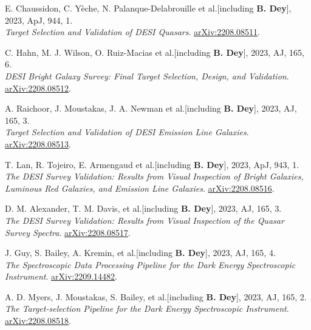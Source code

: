 \begin{etaremune}[leftmargin=40pt,labelsep=10pt]
 \item E. Chaussidon, C. Y\`eche, N. Palanque-Delabrouille et al.[including \textbf{B. Dey}], 2023, ApJ, 944, 1. \\ \textrm{\textit{Target Selection and Validation of DESI Quasars}}. \href{https://arxiv.org/abs/2208.08511}{arXiv:2208.08511}.
 
 \item C. Hahn, M. J. Wilson, O. Ruiz-Macias et al.[including \textbf{B. Dey}], 2023, AJ, 165, 6. \\ \textrm{\textit{DESI Bright Galaxy Survey: Final Target Selection, Design, and Validation}}. \href{https://arxiv.org/abs/2208.08512}{arXiv:2208.08512}.
 
 \item A. Raichoor, J. Moustakas, J. A. Newman et al.[including \textbf{B. Dey}], 2023, AJ, 165, 3. \\ \textrm{\textit{Target Selection and Validation of DESI Emission Line Galaxies}}. \href{https://arxiv.org/abs/2208.08513}{arXiv:2208.08513}.
 
 \item T. Lan, R. Tojeiro, E. Armengaud et al.[including \textbf{B. Dey}], 2023, ApJ, 943, 1. \\ \textrm{\textit{The DESI Survey Validation: Results from Visual Inspection of Bright Galaxies, Luminous Red Galaxies, and Emission Line Galaxies}}. \href{https://arxiv.org/abs/2208.08516}{arXiv:2208.08516}.
 
 \item D. M. Alexander, T. M. Davis, et al.[including \textbf{B. Dey}], 2023, AJ, 165, 3. \\ \textrm{\textit{The DESI Survey Validation: Results from Visual Inspection of the Quasar Survey Spectra}}. \href{https://arxiv.org/abs/2208.08517}{arXiv:2208.08517}.
 
 \item J. Guy, S. Bailey, A. Kremin, et al.[including \textbf{B. Dey}], 2023, AJ, 165, 4. \\ \textrm{\textit{The Spectroscopic Data Processing Pipeline for the Dark Energy Spectroscopic Instrument}}. \href{https://arxiv.org/abs/2209.14482}{arXiv:2209.14482}.
 
 \item A. D. Myers, J. Moustakas, S. Bailey, et al.[including \textbf{B. Dey}], 2023, AJ, 165, 2. \\ \textrm{\textit{The Target-selection Pipeline for the Dark Energy Spectroscopic Instrument}}. \href{https://arxiv.org/abs/2208.08518}{arXiv:2208.08518}.
 

\end{etaremune}
